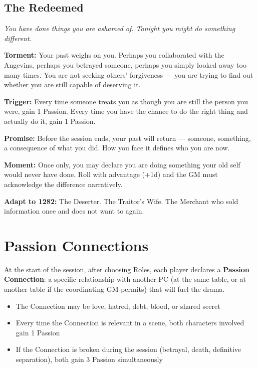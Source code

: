 \filetto

\subsection{The Redeemed}
\textit{You have done things you are ashamed of. Tonight you might do something different.}

\textbf{Torment:} Your past weighs on you. Perhaps you collaborated with
the Angevins, perhaps you betrayed someone, perhaps you simply looked
away too many times. You are not seeking others' forgiveness --- you are
trying to find out whether you are still capable of deserving it.

\textbf{Trigger:} Every time someone treats you as though you are still
the person you were, gain 1 Passion. Every time you have the chance to
do the right thing and actually do it, gain 1 Passion.

\textbf{Promise:} Before the session ends, your past will return ---
someone, something, a consequence of what you did. How you face it
defines who you are now.

\textbf{Moment:} Once only, you may declare you are doing something your
old self would never have done. Roll with advantage (+1d) and the GM
must acknowledge the difference narratively.

\textbf{Adapt to 1282:} The Deserter. The Traitor's Wife. The Merchant
who sold information once and does not want to again.

\secsep

\section{Passion Connections}

At the start of the session, after choosing Roles, each player declares
a \textbf{Passion Connection}: a specific relationship with another PC
(at the same table, or at another table if the coordinating GM permits)
that will fuel the drama.

\begin{itemize}[nosep]
  \item The Connection may be love, hatred, debt, blood, or shared secret
  \item Every time the Connection is relevant in a scene, both characters
    involved gain 1 Passion
  \item If the Connection is broken during the session (betrayal, death,
    definitive separation), both gain 3 Passion simultaneously
\end{itemize}


